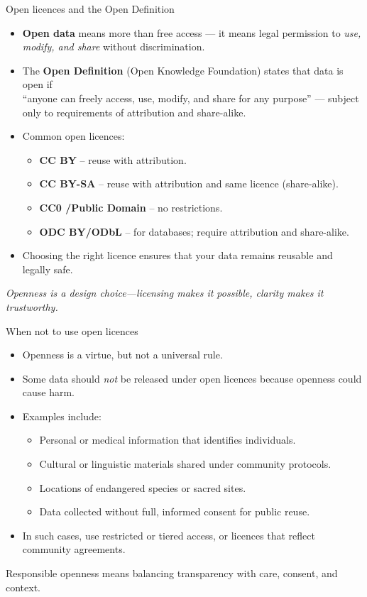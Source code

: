 \documentclass[xetex]{beamer}  %
\begin{document}
\begin{frame}{Open licences and the Open Definition}
\begin{itemize}
  \item \textbf{Open data} means more than free access — it means legal permission to \emph{use, modify, and share} without discrimination.  
  \item The \textbf{Open Definition} (Open Knowledge Foundation) states that data is open if \\
  “anyone can freely access, use, modify, and share for any purpose” 
  — subject only to requirements of attribution and share-alike.
  \item Common open licences:  
    \begin{itemize}
      \item \textbf{CC BY} – reuse with attribution.  
      \item \textbf{CC BY-SA} – reuse with attribution and same licence (share-alike).  
      \item \textbf{CC0 /Public Domain} – no restrictions.  
      \item \textbf{ODC BY/ODbL} – for databases; require attribution and share-alike.
    \end{itemize}
  \item Choosing the right licence ensures that your data remains reusable and legally safe.
\end{itemize}
\medskip
\textit{Openness is a design choice—licensing makes it possible, clarity makes it trustworthy.}
\end{frame}

\begin{frame}{When not to use open licences}
\begin{itemize}
  \item Openness is a virtue, but not a universal rule.  
  \item Some data should \emph{not} be released under open licences because openness could cause harm.
  \item Examples include:
    \begin{itemize}
      \item Personal or medical information that identifies individuals.  
      \item Cultural or linguistic materials shared under community protocols.  
      \item Locations of endangered species or sacred sites.  
      \item Data collected without full, informed consent for public reuse.
    \end{itemize}
  \item In such cases, use restricted or tiered access, or licences that reflect community agreements.
\end{itemize}
\medskip
Responsible openness means balancing transparency with care, consent, and context.
\end{frame}
\end{document}
